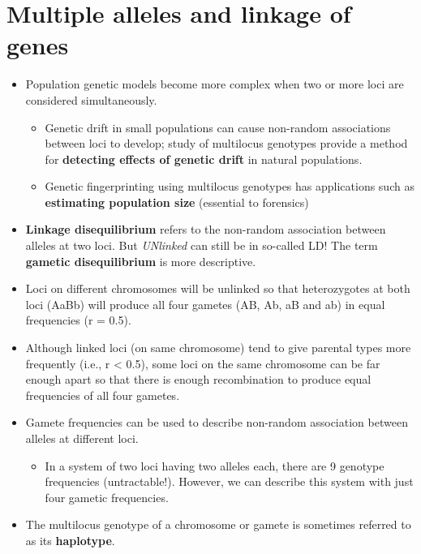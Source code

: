 \documentclass[11pt,dvipsnames,ignorenonframetext,aspectratio=169]{beamer}
\providecommand{\tightlist}{%
  \setlength{\itemsep}{0pt}\setlength{\parskip}{0pt}}
\begin{document}
\hypertarget{multiple-alleles-and-linkage-of-genes}{%
\section{Multiple alleles and linkage of
genes}\label{multiple-alleles-and-linkage-of-genes}}

\begin{frame}{}
\protect\hypertarget{section-26}{}
\footnotesize

\begin{itemize}
\tightlist
\item
  Population genetic models become more complex when two or more loci
  are considered simultaneously.

  \begin{itemize}
  \tightlist
  \item
    Genetic drift in small populations can cause non-random associations
    between loci to develop; study of multilocus genotypes provide a
    method for \textbf{detecting effects of genetic drift} in natural
    populations.
  \item
    Genetic fingerprinting using multilocus genotypes has applications
    such as \textbf{estimating population size} (essential to forensics)
  \end{itemize}
\item
  \textbf{Linkage disequilibrium} refers to the non-random association
  between alleles at two loci. But \emph{UNlinked} can still be in
  so-called LD! The term \textbf{gametic disequilibrium} is more
  descriptive.
\item
  Loci on different chromosomes will be unlinked so that heterozygotes
  at both loci (AaBb) will produce all four gametes (AB, Ab, aB and ab)
  in equal frequencies (r = 0.5).
\item
  Although linked loci (on same chromosome) tend to give parental types
  more frequently (i.e., r \textless{} 0.5), some loci on the same
  chromosome can be far enough apart so that there is enough
  recombination to produce equal frequencies of all four gametes.
\item
  Gamete frequencies can be used to describe non-random association
  between alleles at different loci.

  \begin{itemize}
  \tightlist
  \item
    In a system of two loci having two alleles each, there are 9
    genotype frequencies (untractable!). However, we can describe this
    system with just four gametic frequencies.
  \end{itemize}
\item
  The multilocus genotype of a chromosome or gamete is sometimes
  referred to as its \textbf{haplotype}.
\end{itemize}
\end{frame}
\end{document}
